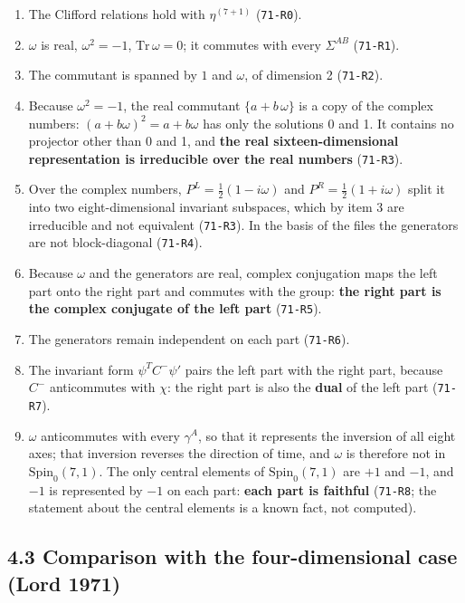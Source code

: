 \documentclass[
  10pt,
]{article}
\providecommand{\tightlist}{%
  \setlength{\itemsep}{0pt}\setlength{\parskip}{0pt}}
\begin{document}
\begin{enumerate}
\def\labelenumi{\arabic{enumi}.}
\tightlist
\item
  The Clifford relations hold with \(\eta^{(7+1)}\) (\texttt{71-R0}).
\item
  \(\omega\) is real, \(\omega^2=-1\), \(\mathrm{Tr}\,\omega=0\); it
  commutes with every \(\Sigma^{AB}\) (\texttt{71-R1}).
\item
  The commutant is spanned by \(1\) and \(\omega\), of dimension 2
  (\texttt{71-R2}).
\item
  Because \(\omega^2=-1\), the real commutant \(\{a+b\,\omega\}\) is a
  copy of the complex numbers: \((a+b\omega)^2=a+b\omega\) has only the
  solutions 0 and 1. It contains no projector other than 0 and 1, and
  \textbf{the real sixteen-dimensional representation is irreducible
  over the real numbers} (\texttt{71-R3}).
\item
  Over the complex numbers, \(P^L=\tfrac12(1-i\omega)\) and
  \(P^R=\tfrac12(1+i\omega)\) split it into two eight-dimensional
  invariant subspaces, which by item 3 are irreducible and not
  equivalent (\texttt{71-R3}). In the basis of the files the generators
  are not block-diagonal (\texttt{71-R4}).
\item
  Because \(\omega\) and the generators are real, complex conjugation
  maps the left part onto the right part and commutes with the group:
  \textbf{the right part is the complex conjugate of the left part}
  (\texttt{71-R5}).
\item
  The generators remain independent on each part (\texttt{71-R6}).
\item
  The invariant form \(\psi^TC^-\psi'\) pairs the left part with the
  right part, because \(C^-\) anticommutes with \(\chi\): the right part
  is also the \textbf{dual} of the left part (\texttt{71-R7}).
\item
  \(\omega\) anticommutes with every \(\gamma^A\), so that it represents
  the inversion of all eight axes; that inversion reverses the direction
  of time, and \(\omega\) is therefore not in \(\mathrm{Spin}_0(7,1)\).
  The only central elements of \(\mathrm{Spin}_0(7,1)\) are \(+1\) and
  \(-1\), and \(-1\) is represented by \(-1\) on each part: \textbf{each
  part is faithful} (\texttt{71-R8}; the statement about the central
  elements is a known fact, not computed).
\end{enumerate}

\hypertarget{comparison-with-the-four-dimensional-case-lord-1971}{%
\subsection{4.3 Comparison with the four-dimensional case (Lord
1971)}\label{comparison-with-the-four-dimensional-case-lord-1971}}
\end{document}
